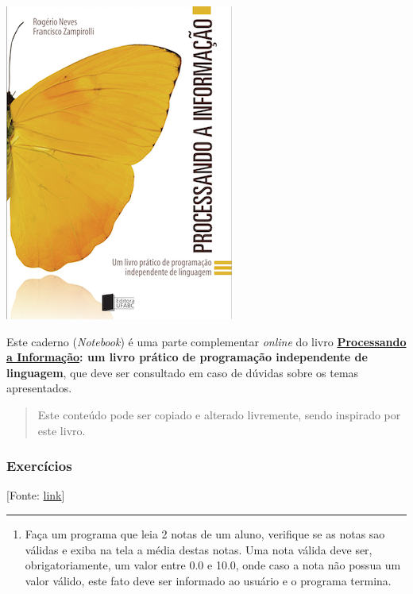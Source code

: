 \documentclass[12pt,a4paper]{article}
\renewcommand{\linethickness}{0.05em}
\providecommand{\tightlist}{%
      \setlength{\itemsep}{0pt}\setlength{\parskip}{0pt}}
\begin{document}
    \includegraphics{"figs/Capa_Processando_Informacao.jpg"}

Este caderno (\emph{Notebook}) é uma parte complementar \emph{online} do
livro
\textbf{\href{https://editora.ufabc.edu.br/matematica-e-ciencias-da-computacao/58-processando-a-informacao}{Processando
a Informação}: um livro prático de programação independente de
linguagem}, que deve ser consultado em caso de dúvidas sobre os temas
apresentados.

\begin{quote}
Este conteúdo pode ser copiado e alterado livremente, sendo inspirado
por este livro.
\end{quote}

    \hypertarget{exercuxedcios}{%
\subsubsection{Exercícios}\label{exercuxedcios}}

{[}Fonte:
\href{http://www.facom.ufu.br/~backes/gbt017/ListaPython02.pdf}{link}{]}

    \begin{center}\rule{0.5\linewidth}{\linethickness}\end{center}

\begin{enumerate}
\def\labelenumi{\arabic{enumi}.}
\tightlist
\item
  Faça um programa que leia 2 notas de um aluno, verifique se as notas
  sao válidas e exiba na tela a média destas notas. Uma nota válida deve
  ser, obrigatoriamente, um valor entre 0.0 e 10.0, onde caso a nota não
  possua um valor válido, este fato deve ser informado ao usuário e o
  programa termina.
\end{enumerate}
\end{document}
